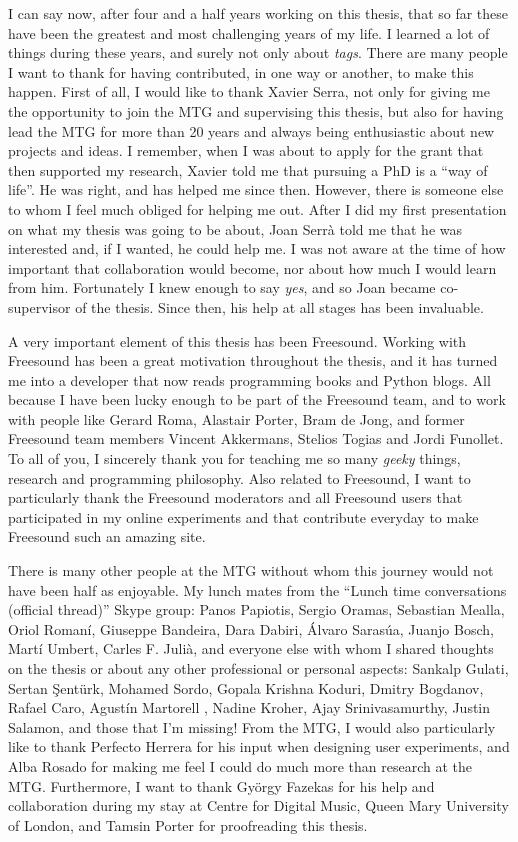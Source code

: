 I can say now, after four and a half years working on this thesis, that so far these have been the greatest and most challenging years of my life. I learned a lot of things during these years, and surely not only about \emph{tags}. There are many people I want to thank for having contributed, in one way or another, to make this happen. First of all, I would like to thank Xavier Serra, not only for giving me the opportunity to join the MTG and supervising this thesis, but also for having lead the MTG for more than 20 years and always being enthusiastic about new projects and ideas. I remember, when I was about to apply for the grant that then supported my research, Xavier told me that pursuing a PhD is a ``way of life''. He was right, and has helped me since then. However, there is someone else to whom I feel much obliged for helping me out. After I did my first presentation on what my thesis was going to be about, Joan Serrà  told me that he was interested and, if I wanted, he could help me. I was not aware at the time of how important that collaboration would become, nor about how much I would learn from him. Fortunately I knew enough to say \emph{yes}, and so Joan became co-supervisor of the thesis. Since then, his help at all stages has been invaluable.

A very important element of this thesis has been Freesound. Working with Freesound has been a great motivation throughout the thesis, and it has turned me into a developer that now reads programming books and Python blogs. All because I have been lucky enough to be part of the Freesound team, and to work with people like Gerard Roma, Alastair Porter, Bram de Jong, and former Freesound team members Vincent Akkermans, Stelios Togias and Jordi Funollet. To all of you, I sincerely thank you for teaching me so many \emph{geeky} things, research and programming philosophy. Also related to Freesound, I want to particularly thank the Freesound moderators and all Freesound users that participated in my online experiments and that contribute everyday to make Freesound such an amazing site.

There is many other people at the MTG without whom this journey would not have been half as enjoyable. My lunch mates from the ``Lunch time conversations (official thread)'' Skype group: Panos Papiotis, Sergio Oramas, Sebastian Mealla, Oriol Romaní, Giuseppe Bandeira, Dara Dabiri, Álvaro Sarasúa, Juanjo Bosch, Martí Umbert, Carles F. Julià, and everyone else with whom I shared thoughts on the thesis or about any other professional or personal aspects: Sankalp Gulati, Sertan Şentürk, Mohamed Sordo, Gopala Krishna Koduri, Dmitry Bogdanov, Rafael Caro, Agustín Martorell , Nadine Kroher, Ajay Srinivasamurthy, Justin Salamon, and those that I'm missing! From the MTG, I would also particularly like to thank Perfecto Herrera for his input when designing user experiments, and Alba Rosado for making me feel I could do much more than research at the MTG. 
Furthermore, I want to thank György Fazekas for his help and collaboration during my stay at Centre for Digital Music, Queen Mary University of London, and Tamsin Porter for proofreading this thesis.

